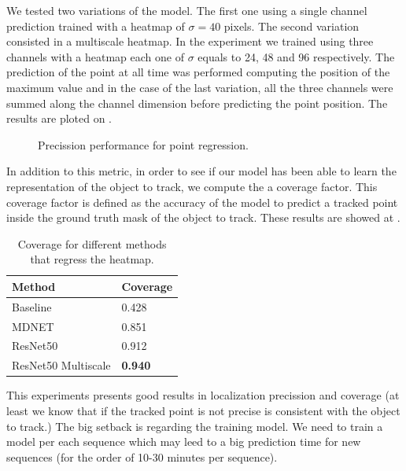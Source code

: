 We tested two variations of the model. The first one using a single channel prediction trained with a heatmap of $\sigma = 40$ pixels.
The second variation consisted in a multiscale heatmap. In the experiment we trained using three channels with a heatmap each one of $\sigma$ equals to 24, 48 and 96 respectively.
The prediction of the point at all time was performed computing the position of the maximum value and in the case of the last variation, all the three channels were summed along the channel dimension before predicting the point position. The results are ploted on .

\begin{figure}[h]
	\centering
	
	\caption{Precission performance for point regression.}
  \label{fig:tracking_point_regression}
\end{figure}

In addition to this metric, in order to see if our model has been able to learn the representation of the object to track, we compute the a coverage factor.
This coverage factor is defined as the accuracy of the model to predict a tracked point inside the ground truth mask of the object to track.
These results are showed at .

\begin{table}[h]
  \centering
  \begin{tabular}{l|l}
    \toprule
    Method              & Coverage       \\
    \midrule
    Baseline            & 0.428          \\
    MDNET               & 0.851          \\
    ResNet50            & 0.912          \\
    ResNet50 Multiscale & \textbf{0.940} \\
    \bottomrule
  \end{tabular}
  \caption{Coverage for different methods that regress the heatmap. }
  \label{tab:coverage_tracking_heatmap}
\end{table}

This experiments presents good results in localization precission and coverage (at least we know that if the tracked point is not precise is consistent with the object to track.)
The big setback is regarding the training model. We need to train a model per each sequence which may leed to a big prediction time for new sequences (for the order of 10-30 minutes per sequence).

